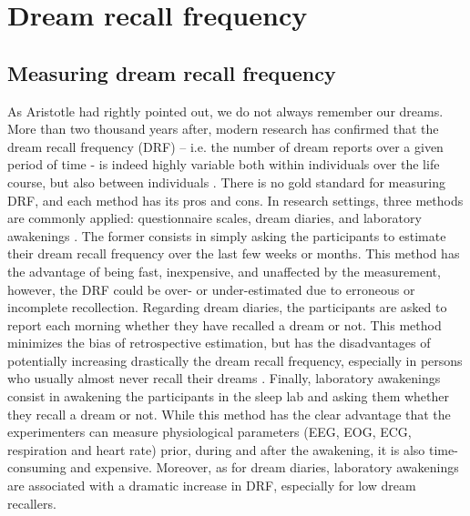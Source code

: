\cleardoublepage

\chapter{Dream recall frequency}
\label{sec:dream-recall}


\section{Measuring dream recall frequency}
\label{sec:dream-recall:method}

As Aristotle had rightly pointed out, we do not always remember our dreams. More than two thousand years after, modern research has confirmed that the dream recall frequency (DRF) – i.e. the number of dream reports over a given period of time -  is indeed highly variable both within individuals over the life course, but also between individuals \citep{schredl_factors_2003, ruby_experimental_2011}.
There is no gold standard for measuring DRF, and each method has its pros and cons. In research settings, three methods are commonly applied: questionnaire scales, dream diaries, and laboratory awakenings \citep{schredl_dream_1999}. The former consists in simply asking the participants to estimate their dream recall frequency over the last few weeks or months. This method has the advantage of being fast, inexpensive, and unaffected by the measurement, however, the DRF could be over- or under-estimated due to erroneous or incomplete recollection. Regarding dream diaries, the participants are asked to report each morning whether they have recalled a dream or not. This method minimizes the bias of retrospective estimation, but has the disadvantages of potentially increasing drastically the dream recall frequency, especially in persons who usually almost never recall their dreams \citep{schredl_questionnaires_2002}. Finally, laboratory awakenings consist in awakening the participants in the sleep lab and asking them whether they recall a dream or not. While this method has the clear advantage that the experimenters can measure physiological parameters (EEG, EOG, ECG, respiration and heart rate) prior, during and after the awakening, it is also time-consuming and expensive. Moreover, as for dream diaries, laboratory awakenings are associated with a dramatic increase in DRF, especially for low dream recallers.

